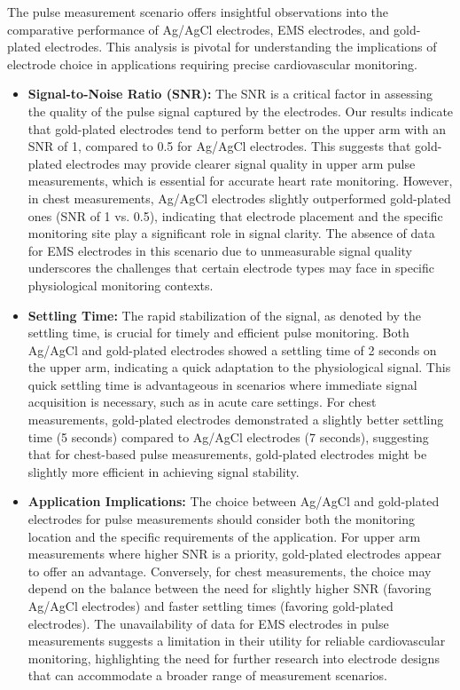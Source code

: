 \documentclass[conference]{IEEEtran}
\begin{document}
The pulse measurement scenario offers insightful observations into the comparative performance of Ag/AgCl electrodes, EMS electrodes, and gold-plated electrodes. This analysis is pivotal for understanding the implications of electrode choice in applications requiring precise cardiovascular monitoring.

\begin{itemize}
    \item \textbf{Signal-to-Noise Ratio (SNR):} The SNR is a critical factor in assessing the quality of the pulse signal captured by the electrodes. Our results indicate that gold-plated electrodes tend to perform better on the upper arm with an SNR of 1, compared to 0.5 for Ag/AgCl electrodes. This suggests that gold-plated electrodes may provide clearer signal quality in upper arm pulse measurements, which is essential for accurate heart rate monitoring. However, in chest measurements, Ag/AgCl electrodes slightly outperformed gold-plated ones (SNR of 1 vs. 0.5), indicating that electrode placement and the specific monitoring site play a significant role in signal clarity. The absence of data for EMS electrodes in this scenario due to unmeasurable signal quality underscores the challenges that certain electrode types may face in specific physiological monitoring contexts.

    \item \textbf{Settling Time:} The rapid stabilization of the signal, as denoted by the settling time, is crucial for timely and efficient pulse monitoring. Both Ag/AgCl and gold-plated electrodes showed a settling time of 2 seconds on the upper arm, indicating a quick adaptation to the physiological signal. This quick settling time is advantageous in scenarios where immediate signal acquisition is necessary, such as in acute care settings. For chest measurements, gold-plated electrodes demonstrated a slightly better settling time (5 seconds) compared to Ag/AgCl electrodes (7 seconds), suggesting that for chest-based pulse measurements, gold-plated electrodes might be slightly more efficient in achieving signal stability.

    \item \textbf{Application Implications:} The choice between Ag/AgCl and gold-plated electrodes for pulse measurements should consider both the monitoring location and the specific requirements of the application. For upper arm measurements where higher SNR is a priority, gold-plated electrodes appear to offer an advantage. Conversely, for chest measurements, the choice may depend on the balance between the need for slightly higher SNR (favoring Ag/AgCl electrodes) and faster settling times (favoring gold-plated electrodes). The unavailability of data for EMS electrodes in pulse measurements suggests a limitation in their utility for reliable cardiovascular monitoring, highlighting the need for further research into electrode designs that can accommodate a broader range of measurement scenarios.
\end{itemize}
\end{document}

